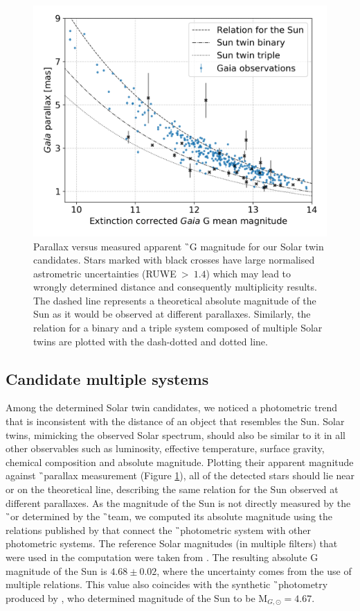 \begin{figure}
	\centering
	\includegraphics[width=\columnwidth]{mag_parallax_gaia_ebv_c3_07.png}
	\caption{Parallax versus measured apparent \G\ G magnitude for our Solar twin candidates. Stars marked with black crosses have large normalised astrometric uncertainties (RUWE~>~$1.4$) which may lead to wrongly determined distance and consequently multiplicity results. The dashed line represents a theoretical absolute magnitude of the Sun as it would be observed at different parallaxes. Similarly, the relation for a binary and a triple system composed of multiple Solar twins are plotted with the dash-dotted and dotted line.}
	\label{fig:par_gmean}
\end{figure}

\subsection{Candidate multiple systems}
\label{sec:multi_cand}
Among the determined Solar twin candidates, we noticed a photometric trend that is inconsistent with the distance of an object that resembles the Sun. Solar twins, mimicking the observed Solar spectrum, should also be similar to it in all other observables such as luminosity, effective temperature, surface gravity, chemical composition and absolute magnitude. Plotting their apparent magnitude against \G\ parallax measurement (Figure \ref{fig:par_gmean}), all of the detected stars should lie near or on the theoretical line, describing the same relation for the Sun observed at different parallaxes. As the magnitude of the Sun is not directly measured by the \G\ or determined by the \G\ team, we computed its absolute magnitude using the relations published by \citet{2018arXiv180409368E} that connect the \G\ photometric system with other photometric systems. The reference Solar magnitudes (in multiple filters) that were used in the computation were taken from \citet{2018ApJS..236...47W}. The resulting absolute G magnitude of the Sun is $4.68 \pm 0.02$, where the uncertainty comes from the use of multiple relations. This value also coincides with the synthetic \G\ photometry produced by \citet{2018MNRAS.479L.102C}, who determined magnitude of the Sun to be M$_{G, \odot} = 4.67$.

